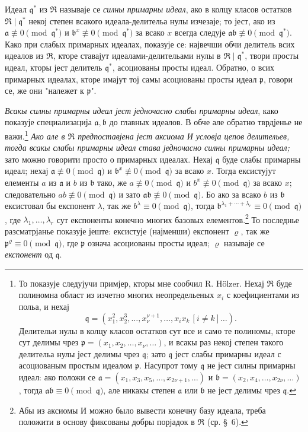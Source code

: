 \documentclass[11pt]{article}
\providecommand{\mR}{\mathfrak{R}}
\providecommand{\ma}{\mathfrak{a}}
\providecommand{\mb}{\mathfrak{b}}
\providecommand{\mq}{\mathfrak{q}}
\providecommand{\mpideal}{\mathfrak{p}}
\begin{document}
Идеал $\mq^*$ из $\mR$ называје се \emph{силны примарны идеал}, ако в колцу класов остатков $\mR\mid\mq^*$ некој степен всакого идеала-делительа нулы изчезаје; то јест, ако из $\ma\not\equiv0\pmod{\mq^*}$ и $\mb^x\not\equiv0\pmod{\mq^*}$ за всако $x$ всегда следује $\ma\mb\not\equiv0\pmod{\mq^*}$. Како при слабых примарных идеалах, показује се: највечши обчи делитель всих идеалов из $\mR$, кторе ставајут идеалами-делительами нулы в $\mR\mid\mq^*$, твори просты идеал, кторы јест делитель $\mq^*$, асоциованы просты идеал. Обратно, о всих примарных идеалах, кторе имајут тој самы асоциованы просты идеал $\mpideal$, говори се, же они "належет к $\mpideal$".

\emph{Всакы силны примарны идеал јест једночасно слабы примарны идеал}, како показује специализација $\ma,\mb$ до главных идеалов. В обче але обратно тврдјенье не важи.\footnote{То показује следујучи примјер, кторы мне сообчил R. Hölzer. Нехај $\mR$ буде полиномна област из изчетно многих неопредельеных $x_i$ с коефициентами из польа, и нехај
\[
\mq=(x_1^2,x_2^3,\ldots,x_\nu^{\nu+1},\ldots,x_i x_k\,[i\ne k]\ldots).
\]
Делительи нулы в колцу класов остатков сут все и само те полиномы, кторе сут делимы чрез $\mpideal=(x_1,x_2,\ldots,x_\nu,\ldots)$, и всакы раз некој степен такого делительа нулы јест делимы чрез $\mq$; зато $\mq$ јест слабы примарны идеал с асоциованым простым идеалом $\mpideal$. Насупрот тому $\mq$ не јест силны примарны идеал: ако положи се $\ma=(x_1,x_3,x_5,\ldots,x_{2\nu+1},\ldots)$ и $\mb=(x_2,x_4,\ldots,x_{2\nu},\ldots)$, тогда $\ma\mb\equiv0\pmod{\mq}$, але никакы степен $\ma$ или $\mb$ не јест делимы чрез $\mq$.} \emph{Ако але в $\mR$ предпоставјена јест аксиома И условја цепов делительев, тогда всакы слабы примарны идеал става једночасно силны примарны идеал;} зато можно говорити просто о примарных идеалах. Нехај $\mq$ буде слабы примарны идеал; нехај $\ma\not\equiv0\pmod{\mq}$ и $\mb^x\not\equiv0\pmod{\mq}$ за всако $x$. Тогда ексистујут елементы $a$ из $\ma$ и $b$ из $\mb$ тако, же $a\not\equiv0\pmod{\mq}$ и $b^x\not\equiv0\pmod{\mq}$ за всако $x$; следовательно $ab\not\equiv0\pmod{\mq}$ и зато $\ma\mb\not\equiv0\pmod{\mq}$. Бо ако за всако $b$ из $\mb$ ексистовал бы експонент $\lambda$, так же $b^\lambda\equiv0\pmod{\mq}$, тогда $\mb^{\lambda_1+\cdots+\lambda_r}\equiv0\pmod{\mq}$, где $\lambda_1,\ldots,\lambda_r$ сут експоненты конечно многих базовых елементов.\footnote{Абы из аксиомы И можно было вывести конечну базу идеала, треба положити в основу фиксованы добры порјадок в $\mR$ (ср. \S~6).} То последнье разсматрјанье показује јеште: ексистује (најменши) експонент $\varrho$, так же $\mpideal^\varrho\equiv0\pmod{\mq}$, где $\mpideal$ означа асоциованы просты идеал; $\varrho$ называје се \emph{експонент} од $\mq$.
\end{document}
